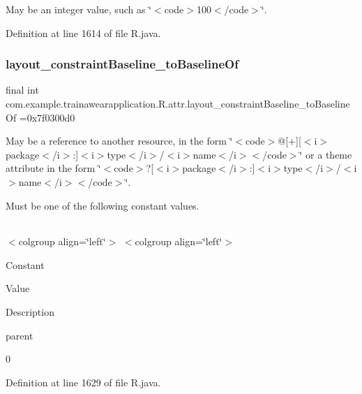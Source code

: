 May be an integer value, such as \char`\"{}$<$code$>$100$<$/code$>$\char`\"{}. 

Definition at line 1614 of file R.\+java.

\mbox{\label{classcom_1_1example_1_1trainawearapplication_1_1_r_1_1attr_a85b873b5a37b47ad19a9f2126b5cc0f6}} 
\subsubsection{\texorpdfstring{layout\_constraintBaseline\_toBaselineOf}{layout\_constraintBaseline\_toBaselineOf}}
{\footnotesize\ttfamily final int com.\+example.\+trainawearapplication.\+R.\+attr.\+layout\+\_\+constraint\+Baseline\+\_\+to\+Baseline\+Of =0x7f0300d0\hspace{0.3cm}{\ttfamily [static]}}

May be a reference to another resource, in the form \char`\"{}$<$code$>$@\mbox{[}+\mbox{]}\mbox{[}$<$i$>$package$<$/i$>$\+:\mbox{]}$<$i$>$type$<$/i$>$/$<$i$>$name$<$/i$>$$<$/code$>$\char`\"{} or a theme attribute in the form \char`\"{}$<$code$>$?\mbox{[}$<$i$>$package$<$/i$>$\+:\mbox{]}$<$i$>$type$<$/i$>$/$<$i$>$name$<$/i$>$$<$/code$>$\char`\"{}. 

Must be one of the following constant values.

\tabulinesep=1mm
\begin{longtabu}spread 0pt [c]{*{0}{|X[-1]}|}
\hline
\end{longtabu}
$<$colgroup align=\char`\"{}left\char`\"{}$>$ $<$colgroup align=\char`\"{}left\char`\"{}$>$ 

Constant

Value

Description 

parent

0

Definition at line 1629 of file R.\+java.

\mbox{\label{classcom_1_1example_1_1trainawearapplication_1_1_r_1_1attr_afb806df9fd600be2881204f4ab00a738}} 
